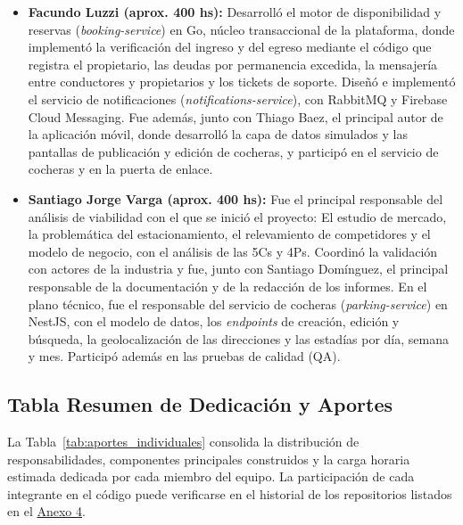 \begin{itemize}
    \item \textbf{Facundo Luzzi (aprox. 400 hs):}
    Desarrolló el motor de disponibilidad y reservas (\textit{booking-service}) en Go, núcleo transaccional de la plataforma, donde implementó la verificación del ingreso y del egreso mediante el código que registra el propietario, las deudas por permanencia excedida, la mensajería entre conductores y propietarios y los tickets de soporte. Diseñó e implementó el servicio de notificaciones (\textit{notifications-service}), con RabbitMQ y Firebase Cloud Messaging. Fue además, junto con Thiago Baez, el principal autor de la aplicación móvil, donde desarrolló la capa de datos simulados y las pantallas de publicación y edición de cocheras, y participó en el servicio de cocheras y en la puerta de enlace.

    \item \textbf{Santiago Jorge Varga (aprox. 400 hs):}
    Fue el principal responsable del análisis de viabilidad con el que se inició el proyecto: El estudio de mercado, la problemática del estacionamiento, el relevamiento de competidores y el modelo de negocio, con el análisis de las 5Cs y 4Ps. Coordinó la validación con actores de la industria y fue, junto con Santiago Domínguez, el principal responsable de la documentación y de la redacción de los informes. En el plano técnico, fue el responsable del servicio de cocheras (\textit{parking-service}) en NestJS, con el modelo de datos, los \textit{endpoints} de creación, edición y búsqueda, la geolocalización de las direcciones y las estadías por día, semana y mes. Participó además en las pruebas de calidad (QA).
\end{itemize}

\subsection{Tabla Resumen de Dedicación y Aportes}

La Tabla~\ref{tab:aportes_individuales} consolida la distribución de responsabilidades, componentes principales construidos y la carga horaria estimada dedicada por cada miembro del equipo. La participación de cada integrante en el código puede verificarse en el historial de los repositorios listados en el \hyperref[anexo:repositorios]{Anexo 4}.

\vspace{0.3cm}

